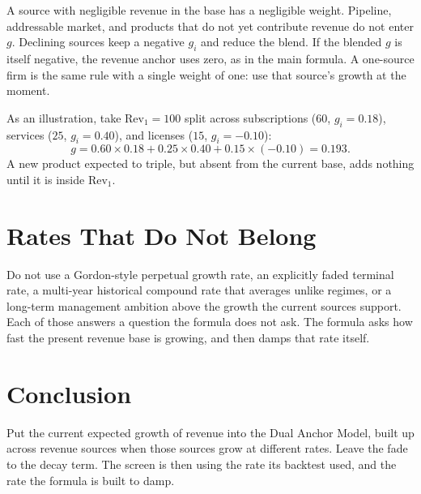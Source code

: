 \documentclass[11pt]{article}
\begin{document}
A source with negligible revenue in the base has a negligible weight. Pipeline, addressable market, and products that do not yet contribute revenue do not enter \(g\). Declining sources keep a negative \(g_i\) and reduce the blend. If the blended \(g\) is itself negative, the revenue anchor uses zero, as in the main formula. A one-source firm is the same rule with a single weight of one: use that source's growth at the moment.

As an illustration, take \(\mathrm{Rev}_1 = 100\) split across subscriptions (\(60\), \(g_i = 0.18\)), services (\(25\), \(g_i = 0.40\)), and licenses (\(15\), \(g_i = -0.10\)):
\begin{equation}
g = 0.60 \times 0.18 + 0.25 \times 0.40 + 0.15 \times (-0.10) = 0.193.
\end{equation}
A new product expected to triple, but absent from the current base, adds nothing until it is inside \(\mathrm{Rev}_1\).

\section{Rates That Do Not Belong}
Do not use a Gordon-style perpetual growth rate, an explicitly faded terminal rate, a multi-year historical compound rate that averages unlike regimes, or a long-term management ambition above the growth the current sources support. Each of those answers a question the formula does not ask. The formula asks how fast the present revenue base is growing, and then damps that rate itself.

\section{Conclusion}
Put the current expected growth of revenue into the Dual Anchor Model, built up across revenue sources when those sources grow at different rates. Leave the fade to the decay term. The screen is then using the rate its backtest used, and the rate the formula is built to damp.
\end{document}
